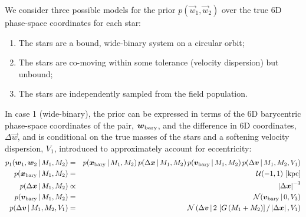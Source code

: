 \documentclass[12pt,letterpaper]{article}
\begin{document}
We consider three possible models for the prior $p(\vec{w}_1, \vec{w}_2)$ over
the true 6D phase-space coordinates for each star:
\begin{enumerate}
    \item The stars are a bound, wide-binary system on a circular orbit;
    \item The stars are co-moving within some tolerance (velocity dispersion)
    but unbound;
    \item The stars are independently sampled from the field population.
\end{enumerate}
In case 1 (wide-binary), the prior can be expressed in terms of the 6D
barycentric phase-space coordinates of the pair, $\vec{w}_{\rm bary}$, and the
difference in 6D coordinates, $\Delta\vec{w}$, and is conditional on the true
masses of the stars and a softening velocity dispersion, $V_1$, introduced to
approximately account for eccentricity:
\begin{eqnarray}
    p_1(\vec{w}_1, \vec{w}_2 \given M_1, M_2) &=&
        p(\vec{x}_{\rm bary} \given M_1, M_2) \,
        p(\Delta\vec{x} \given M_1, M_2) \,
        p(\vec{v}_{\rm bary} \given M_1, M_2) \,
        p(\Delta\vec{v} \given M_1, M_2, V_1) \\
    p(\vec{x}_{\rm bary} \given M_1, M_2) &=& \mathcal{U}(-1,1)~[{\rm kpc}] \\
    p(\Delta\vec{x} \given M_1, M_2) &\propto& \left|\Delta\vec{x}\right|^{-3} \\
    p(\vec{v}_{\rm bary} \given M_1, M_2) &=&
      \mathcal{N}(\vec{v}_{\rm bary} \given 0, V_3) \\
    p(\Delta\vec{v} \given M_1, M_2, V_1) &=&
      \mathcal{N}\left(\Delta\vec{v} \given
        2\,\left[G \, (M_1+M_2)\right]/\left|\Delta\vec{x}\right|, V_1\right) \\
\end{eqnarray}


%
\end{document}

